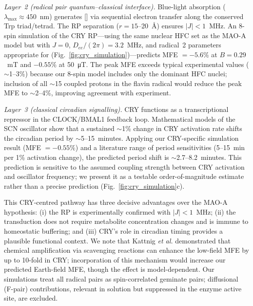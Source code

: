 \documentclass[twoside,twocolumn,9pt]{article}
\begin{document}
\textit{Layer~2 (radical pair quantum--classical interface).} Blue-light absorption ($\lambda_\mathrm{max} \approx 450$~nm) generates [] via sequential electron transfer along the conserved Trp triad/tetrad.\cite{Xu2021} The RP separation ($r = 15$--20~\AA) ensures $|J| < 1$~MHz.\cite{Hiscock2016} An 8-spin simulation of the CRY RP---using the same nuclear HFC set as the MAO-A model but with $J = 0$, $D_{ee}/(2\pi) = 3.2$~MHz, and radical~2 parameters appropriate for  (Fig.~\ref{fig:cry_simulation})---predicts MFE $= -5.6\%$ at $B = 0.29$~mT and $-0.55\%$ at 50~\si{\micro\tesla}. The peak MFE exceeds typical experimental values ($\sim$1--3\%\cite{Maeda2012}) because our 8-spin model includes only the dominant HFC nuclei; inclusion of all $\sim$15 coupled protons in the flavin radical would reduce the peak MFE to $\sim$2--4\%,\cite{Hiscock2016} improving agreement with experiment.

\textit{Layer~3 (classical circadian signalling).} CRY functions as a transcriptional repressor in the CLOCK/BMAL1 feedback loop.\cite{Partch2014} Mathematical models of the SCN oscillator show that a sustained $\sim$1\% change in CRY activation rate shifts the circadian period by $\sim$5--15~minutes.\cite{Forger2011} Applying our CRY-specific simulation result (MFE $= -0.55\%$) and a literature range of period sensitivities (5--15~min per 1\% activation change\cite{Forger2011}), the predicted period shift is $\sim$2.7--8.2~minutes. This prediction is sensitive to the assumed coupling strength between CRY activation and oscillator frequency; we present it as a testable order-of-magnitude estimate rather than a precise prediction (Fig.~\ref{fig:cry_simulation}c).

This CRY-centred pathway has three decisive advantages over the MAO-A hypothesis: (i) the RP is experimentally confirmed with $|J| < 1$~MHz;\cite{Xu2021,Hiscock2016} (ii) the transduction does not require metabolite concentration changes and is immune to homeostatic buffering; and (iii) CRY's role in circadian timing provides a plausible functional context. We note that Kattnig \textit{et al.}\cite{Kattnig2016} demonstrated that chemical amplification via scavenging reactions can enhance the low-field MFE by up to 10-fold in CRY; incorporation of this mechanism would increase our predicted Earth-field MFE, though the effect is model-dependent. Our simulations treat all radical pairs as spin-correlated geminate pairs; diffusional (F-pair) contributions, relevant in solution but suppressed in the enzyme active site, are excluded.
\end{document}
